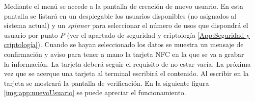 \documentclass[../PFC.tex]{subfiles}
\begin{document}
Mediante el menú se accede a la pantalla de creación de nuevo usuario. En esta pantalla se listará en un desplegable los usuarios disponibles (no asignados al sistema actual) y un \textit{spinner} para seleccionar el número de usos que dispondrá el usuario por punto $P$ (ver el apartado de seguridad y criptología \ref{App:Seguridad y criptología}). Cuando se hayan seleccionado los datos se muestra un mensaje de confirmación y aviso para tener a mano la tarjeta NFC en la que se va a grabar la información. La tarjeta deberá seguir el requisito de no estar vacía. La próxima vez que se acerque una tarjeta al terminal escribirá el contenido. Al escribir en la tarjeta se mostrará la pantalla de verificación. En la siguiente figura \ref{img:app:nuevoUsuario} se puede apreciar el funcionamiento.

\end{document}
